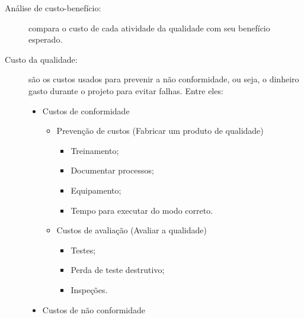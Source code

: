 \begin{description}

	\item[Análise de custo-benefício:] compara o custo de cada atividade da qualidade com seu benefício esperado.
	
	\item[Custo da qualidade:] são os custos usados para prevenir a não conformidade, ou seja, o dinheiro gasto durante o projeto para evitar falhas. Entre eles:
	
	\begin{itemize}
		
		\item Custos de conformidade
					
		\begin{itemize}

			\item Prevenção de custos (Fabricar um produto de qualidade)
			
			\begin{itemize}
				
				\item Treinamento;
				
				\item Documentar processos;
				
				\item Equipamento;
				
				\item Tempo para executar do modo correto.
				
			\end{itemize}
			
			\item Custos de avaliação (Avaliar a qualidade)
			
			\begin{itemize}
				
				\item Testes;
				
				\item Perda de teste destrutivo;
				
				\item Inspeções.
				
			\end{itemize}
			
		\end{itemize}
	
		\item Custos de não conformidade
		
		\begin{itemize}
		

\end{itemize}
\end{itemize}
\end{description}

